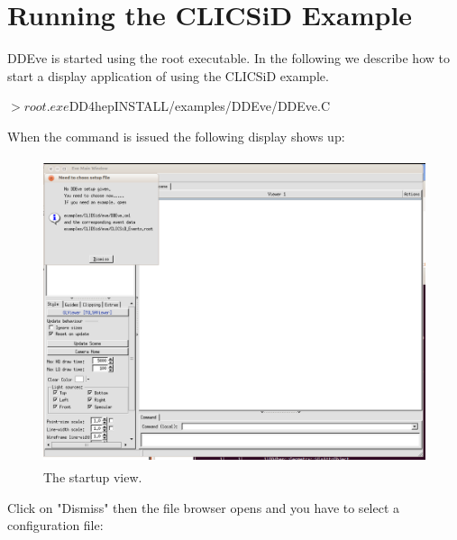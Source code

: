\documentclass[10pt,a4paper]{article}
\begin{document}
\section{Running the CLICSiD Example}
\label{sec:ddeve-user-manual-introduction}
\noindent
DDEve is started using the root executable. In the following we describe 
how to start a display application of \DDE using the CLICSiD example.
\begin{unnumberedcode}
$> root.exe $DD4hepINSTALL/examples/DDEve/DDEve.C 
\end{unnumberedcode}
When the command is issued the following display shows up:
\begin{figure}[h]
  \begin{center}
    \includegraphics[height=90mm] {DDEve_1.png}
    \caption{The \DDE startup view.}
    \label{fig:DDEve_1.png}
  \end{center}
\end{figure}
\newpage
\noindent
Click on "Dismiss" then the file browser opens and you have to select 
a \DDE configuration file:
\end{document}
